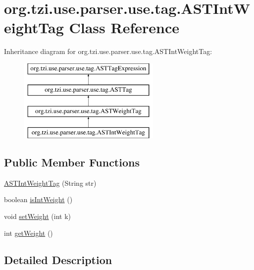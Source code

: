 \hypertarget{classorg_1_1tzi_1_1use_1_1parser_1_1use_1_1tag_1_1_a_s_t_int_weight_tag}{\section{org.\-tzi.\-use.\-parser.\-use.\-tag.\-A\-S\-T\-Int\-Weight\-Tag Class Reference}
\label{classorg_1_1tzi_1_1use_1_1parser_1_1use_1_1tag_1_1_a_s_t_int_weight_tag}
}
Inheritance diagram for org.\-tzi.\-use.\-parser.\-use.\-tag.\-A\-S\-T\-Int\-Weight\-Tag\-:\begin{figure}[H]
\begin{center}
\leavevmode
\includegraphics[height=4.000000cm]{classorg_1_1tzi_1_1use_1_1parser_1_1use_1_1tag_1_1_a_s_t_int_weight_tag}
\end{center}
\end{figure}
\subsection*{Public Member Functions}
\begin{DoxyCompactItemize}
\item 
\hyperlink{classorg_1_1tzi_1_1use_1_1parser_1_1use_1_1tag_1_1_a_s_t_int_weight_tag_aaba33879c25cac0c4fe6624b7d225b68}{A\-S\-T\-Int\-Weight\-Tag} (String str)
\item 
boolean \hyperlink{classorg_1_1tzi_1_1use_1_1parser_1_1use_1_1tag_1_1_a_s_t_int_weight_tag_a2fed6e28a84f7dc2dd8694327ab1bd38}{is\-Int\-Weight} ()
\item 
void \hyperlink{classorg_1_1tzi_1_1use_1_1parser_1_1use_1_1tag_1_1_a_s_t_int_weight_tag_ab3870f1da69f1953fe98eb13956b5180}{set\-Weight} (int k)
\item 
int \hyperlink{classorg_1_1tzi_1_1use_1_1parser_1_1use_1_1tag_1_1_a_s_t_int_weight_tag_a24923646e07214ee8a807c6563c7687b}{get\-Weight} ()
\end{DoxyCompactItemize}


\subsection{Detailed Description}


